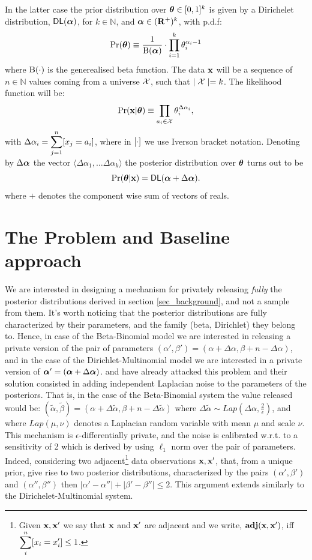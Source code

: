 \documentclass[sigconf, anonymous]{acmart}
\begin{document}
In the latter case the prior distribution over $\boldsymbol{\theta}\in [0,1]^{k}$ is given by a Dirichelet distribution, $\mathsf{DL}(\boldsymbol{\alpha})$, for $k\in\mathbb{N}$,
and $\boldsymbol{\alpha}\in(\mathbf{R^{+}})^{k}$, with p.d.f:
\[
  \Pr(\boldsymbol{\theta})\equiv\frac{1}{\boldsymbol{\textup{B}}(\boldsymbol{\alpha})}\cdot \displaystyle\prod_{i=1}^{k}{\theta_i^{\alpha_i-1}}
\]
where $\boldsymbol{\textup{B}}(\cdot)$ is the generealised beta function.
The data $\textbf{x}$ will be a sequence of $n\in\mathbb{N}$ values coming from a universe $\mathcal{X}$, such that $\mid\mathcal{X} \mid=k$.
The likelihood function will be:
\[
  \Pr(\textbf{x}|\boldsymbol{\theta})\equiv \displaystyle\prod_{a_i\in\mathcal{X}}\theta_{i}^{\Delta \alpha_i},
\]
with $\Delta \alpha_i=\displaystyle\sum_{j=1}^{n}[x_j=a_i]$, where in $[\cdot]$ we use
Iverson bracket notation. Denoting by $\Delta\boldsymbol{\alpha}$ the vector $\langle  \Delta\alpha_1,\dots \Delta\alpha_k \rangle$ the posterior distribution over $\boldsymbol{\theta}$ turns out to be
\[
  \Pr(\boldsymbol{\theta}|\textbf{x})=\mathsf{DL}(\boldsymbol{\alpha}+\Delta \boldsymbol{\alpha}). 
\]
where $+$ denotes the component wise  sum of vectors of reals. 


\section{The Problem and Baseline approach}
\label{sec:base}
We are interested in designing a mechanism for privately releasing
\emph{fully} the posterior distributions derived in section \ref{sec_background},
and not a sample from them.  It's worth noticing that the posterior
distributions are fully characterized by their parameters, and the
family (beta, Dirichlet) they belong to.  Hence, in case of the
Beta-Binomial model we are interested in releasing a private version
of the pair of parameters $(\alpha',\beta')=(\alpha + \Delta \alpha,\beta + n - \Delta \alpha)$, and
in the case of the Dirichlet-Multinomial model we are interested in a
private version of $\boldsymbol{\alpha}'=(\boldsymbol{\alpha} + \Delta \boldsymbol{\alpha})$. \citet{zhang2016differential} and \citet{xiao2012bayesian} have
already attacked this problem and their solution consisted in adding
independent Laplacian noise to the parameters of the posteriors. That
is, in the case of the Beta-Binomial system the value released would
be: $(\tilde\alpha,\tilde\beta)=(\alpha + \Delta \tilde\alpha,\beta + n - \Delta \tilde\alpha)$ where $\Delta \tilde\alpha\sim Lap(\Delta \alpha, \frac{2}{\epsilon})$, and
where $Lap(\mu,\nu)$
denotes a Laplacian random variable with mean $\mu$ and scale $\nu$.
This mechanism is $\epsilon$-differentially private, and the noise is
calibrated w.r.t. to a sensitivity of 2 which is derived by using
$\ell_1$ norm over the pair of parameters. Indeed, considering two
adjacent\footnote{Given $\textbf{x}, \textbf{x}'$  we say that $\textbf{x}$ and $\textbf{x}'$ are adjacent and we write, $\textbf{adj}(\textbf{x},\textbf{x}')$, iff\\
$\displaystyle \sum_{i}^{n}[x_i = x'_i ]\leq 1$. } data observations
$\textbf{x}, \textbf{x}'$, that, from a unique prior, give rise to two posterior
distributions, characterized by the pairs
$(\alpha',\beta')$ and $(\alpha'',\beta'')$ then
$|\alpha'-\alpha''|+|\beta'-\beta''|\leq 2$.
This argument extends similarly to the Dirichelet-Multinomial system.
\end{document}
